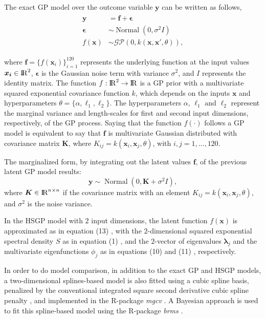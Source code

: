 \documentclass[onecolumn,a4paper,11pt]{article}
\DeclareMathOperator{\Normal}{Normal}
\begin{document}
The exact GP model over the outcome variable $\bm{y}$ can be written as follows,
%
\begin{eqnarray*}\label{ch5_eq_latentgp_simudata2}
\begin{split}
\bm{y} &= \bm{f} + \bm{\epsilon} \\
\bm{\epsilon} &\sim \Normal(0, \sigma^2  I) \\
f(\bm{x}) &\sim \mathcal{GP}(0, k(\bm{x}, \bm{x}', \theta)),
\end{split}
\end{eqnarray*}

\noindent where $\bm{f}=\{f(\bm{x}_i)\}_{i=1}^{120}$ represents the underlying function at the input values $\bm{x_i}\in {\rm I\!R}^{2}$, $\bm{\epsilon}$ is the Gaussian noise term with variance $\sigma^2$, and $I$ represents the identity matrix. The function $f:{\rm I\!R}^2 \to {\rm I\!R}$ is a GP prior with a multivariate squared exponential covariance function $k$, which depends on the inputs $\bm{x}$ and hyperparameters $\theta=\{\alpha,\ell_1,\ell_2\}$. The hyperparameters $\alpha$, $\ell_1$ and $\ell_2$ represent the marginal variance and length-scales for first and second input dimensions, respectively, of the GP process. Saying that the function $f(\cdot)$ follows a GP model is equivalent to say that $\bm{f}$ is multivariate Gaussian distributed with covariance matrix $\bm{K}$, where $K_{ij}=k(\bm{x}_i,\bm{x}_j,\theta)$, with $i,j=1,\dots,120$.

The marginalized form, by integrating out the latent values $\bm{f}$, of the previous latent GP model results:
%
\begin{equation*}\label{ch5_eq_marginalizedgp_simudata2}
\bm{y} \sim \Normal(0, \bm{K} + \sigma^2 I ),
\end{equation*}
%
where $\bm{K} \in {\rm I\!R}^{n\times n}$ if the covariance matrix with an element $K_{ij}=k(\bm{x}_i,\bm{x}_j,\theta)$, and $\sigma^2$ is the noise variance.

In the HSGP model with $2$ input dimensions, the latent function $f(\bm{x})$ is approximated as in equation (13)%
, with the $2$-dimensional squared exponential spectral density $S$ as in equation (1)%
, and the $2$-vector of eigenvalues $\bm{\lambda}_j$ and the multivariate eigenfunctions $\phi_j$ as in equations (10) %
 and (11)%
 , respectively.


In order to do model comparison, in addition to the exact GP and HSGP models, a two-dimensional splines-based model is also fitted using a cubic spline basis, penalized by the conventional integrated square second derivative cubic spline penalty \citep{wood2017generalized}, and implemented in the R-package \textit{mgcv} \citep{wood2011mgcv}. A Bayesian approach is used to fit this spline-based model using the R-package \textit{brms} \citep{burkner2017brms}.
\end{document}
